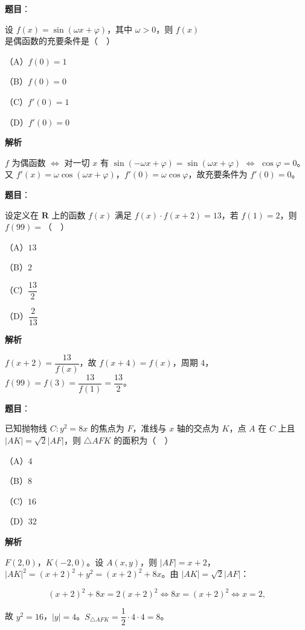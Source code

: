 \begin{answer}

\textbf{题目}：

设 $f(x)=\sin(\omega x+\varphi)$，其中 $\omega>0$，则 $f(x)$ 是偶函数的充要条件是（　）

（A）$f(0)=1$

（B）$f(0)=0$

（C）$f'(0)=1$

（D）$f'(0)=0$

\textbf{解析}

$f$ 为偶函数 $\iff$ 对一切 $x$ 有 $\sin(-\omega x+\varphi)=\sin(\omega x+\varphi)$ $\iff$ $\cos\varphi=0$。又 $f'(x)=\omega\cos(\omega x+\varphi)$，$f'(0)=\omega\cos\varphi$，故充要条件为 $f'(0)=0$。


\end{answer}
\begin{answer}

\textbf{题目}：

设定义在 $\mathbf R$ 上的函数 $f(x)$ 满足 $f(x)\cdot f(x+2)=13$，若 $f(1)=2$，则 $f(99)=$（　）

（A）$13$

（B）$2$

（C）$\dfrac{13}2$

（D）$\dfrac2{13}$

\textbf{解析}

$f(x+2)=\dfrac{13}{f(x)}$，故 $f(x+4)=f(x)$，周期 $4$，$f(99)=f(3)=\dfrac{13}{f(1)}=\dfrac{13}2$。


\end{answer}
\begin{answer}

\textbf{题目}：

已知抛物线 $C:y^2=8x$ 的焦点为 $F$，准线与 $x$ 轴的交点为 $K$，点 $A$ 在 $C$ 上且 $|AK|=\sqrt2|AF|$，则 $\triangle AFK$ 的面积为（　）

（A）$4$

（B）$8$

（C）$16$

（D）$32$

\textbf{解析}

$F(2,0)$，$K(-2,0)$。设 $A(x,y)$，则 $|AF|=x+2$，$|AK|^2=(x+2)^2+y^2=(x+2)^2+8x$。由 $|AK|=\sqrt2|AF|$：

\nopagebreak[4]
\[(x+2)^2+8x=2(x+2)^2\iff 8x=(x+2)^2\iff x=2,\]

故 $y^2=16$，$|y|=4$。$S_{\triangle AFK}=\dfrac12\cdot4\cdot4=8$。


\end{answer}
